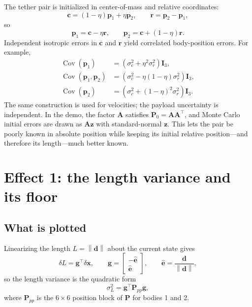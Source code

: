\documentclass{article}
\newcommand{\Pm}{\mathbf{P}}
\newcommand{\norm}[1]{\left\lVert #1 \right\rVert}
\newcommand{\ehat}{\hat{\bm{e}}}
\begin{document}
The tether pair is initialized in center-of-mass and relative coordinates:
\begin{equation}
  \mathbf{c}=(1-\eta)\mathbf{p}_1+\eta\mathbf{p}_2,\qquad
  \mathbf{r}=\mathbf{p}_2-\mathbf{p}_1,
\end{equation}
so
\begin{equation}
  \mathbf{p}_1=\mathbf{c}-\eta\mathbf{r},\qquad
  \mathbf{p}_2=\mathbf{c}+(1-\eta)\mathbf{r}.
\end{equation}
Independent isotropic errors in $\mathbf{c}$ and $\mathbf{r}$ yield correlated
body-position errors. For example,
\begin{align}
  \operatorname{Cov}(\mathbf{p}_1)
    &=\left(\sigma_c^2+\eta^2\sigma_r^2\right)\mathbf{I}_3,\\
  \operatorname{Cov}(\mathbf{p}_1,\mathbf{p}_2)
    &=\left(\sigma_c^2-\eta(1-\eta)\sigma_r^2\right)\mathbf{I}_3,\\
  \operatorname{Cov}(\mathbf{p}_2)
    &=\left(\sigma_c^2+(1-\eta)^2\sigma_r^2\right)\mathbf{I}_3.
\end{align}
The same construction is used for velocities; the payload uncertainty is
independent. In the demo, the factor $\mathbf{A}$ satisfies
$\Pm_0=\mathbf{A}\mathbf{A}^\top$, and Monte Carlo initial errors are drawn
as $\mathbf{A}\mathbf{z}$ with standard-normal $\mathbf{z}$. This lets the
pair be poorly known in absolute position while keeping its initial relative
position—and therefore its length—much better known.

\section{Effect 1: the length variance and its floor}

\subsection{What is plotted}

Linearizing the length $L = \norm{\bm{d}}$ about the current state gives
\begin{equation}
  \delta L = \bm{g}^{\top}\delta\bm{x}, \qquad
  \bm{g} = \begin{bmatrix} -\ehat \\ \ehat \end{bmatrix}, \qquad
  \ehat = \frac{\bm{d}}{\norm{\bm{d}}},
\end{equation}
so the length variance is the quadratic form
\begin{equation}
  \sigma_L^2 = \bm{g}^{\top}\Pm_{pp}\bm{g},
  \label{eq:sigmaL}
\end{equation}
where $\Pm_{pp}$ is the $6\times6$ position block of $\Pm$ for bodies 1 and 2.
\end{document}
